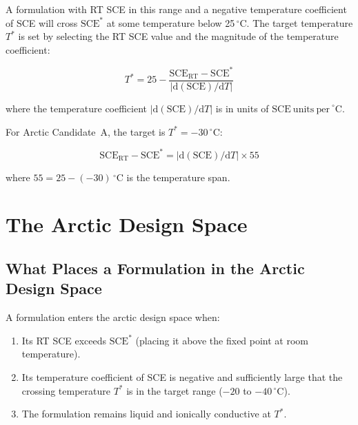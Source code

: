 \documentclass[11pt]{article}
\theoremstyle{plain}
\theoremstyle{definition}
\theoremstyle{remark}
\begin{document}
A formulation with RT SCE in this range and a negative temperature
coefficient of SCE will cross $\mathrm{SCE}^{*}$ at some temperature
below 25\,$^\circ$C.  The target temperature $T^{*}$ is set by
selecting the RT SCE value and the magnitude of the temperature
coefficient:

\begin{equation}
  T^{*} = 25 - \frac{\mathrm{SCE}_\mathrm{RT} - \mathrm{SCE}^{*}}
  {|\mathrm{d}(\mathrm{SCE})/\mathrm{d}T|}
  \label{eq:T_star_formula}
\end{equation}

where the temperature coefficient
$|\mathrm{d}(\mathrm{SCE})/\mathrm{d}T|$ is in units of
$\mathrm{SCE~units~per~}^\circ\mathrm{C}$.

For Arctic Candidate~A, the target is $T^{*} = -30\,^\circ$C:

\begin{equation}
  \mathrm{SCE}_\mathrm{RT} - \mathrm{SCE}^{*} =
  |\mathrm{d}(\mathrm{SCE})/\mathrm{d}T| \times 55
  \label{eq:candidate_A_target}
\end{equation}

where $55 = 25 - (-30)$\,$^\circ$C is the temperature span.

\section{The Arctic Design Space}
\label{sec:arctic_design_space}

\subsection{What Places a Formulation in the Arctic Design Space}

A formulation enters the arctic design space when:
\begin{enumerate}[leftmargin=2em]
  \item Its RT SCE exceeds $\mathrm{SCE}^{*}$ (placing it above
        the fixed point at room temperature).
  \item Its temperature coefficient of SCE is negative and
        sufficiently large that the crossing temperature
        $T^{*}$ is in the target range ($-20$ to $-40\,^\circ$C).
  \item The formulation remains liquid and ionically conductive
        at $T^{*}$.
\end{enumerate}
\end{document}
